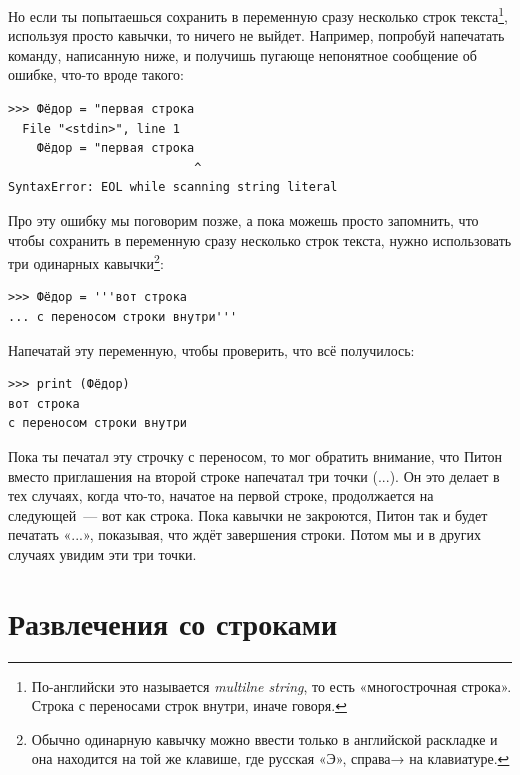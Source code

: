 Но если ты попытаешься сохранить в переменную сразу несколько строк текста\footnote{По-английски это называется \emph{multilne string}, то есть «многострочная строка». Строка с переносами строк внутри, иначе говоря.}, используя просто кавычки, то ничего не выйдет. Например, попробуй напечатать команду, написанную ниже, и получишь пугающе непонятное сообщение об ошибке, что-то вроде такого:

\begin{listing}
\begin{verbatim}
>>> Фёдор = "первая строка
  File "<stdin>", line 1
    Фёдор = "первая строка
                          ^
SyntaxError: EOL while scanning string literal
\end{verbatim}
\end{listing}

Про эту ошибку мы поговорим позже, а пока можешь просто запомнить, что чтобы сохранить в переменную сразу несколько строк текста, нужно использовать три одинарных кавычки\footnote{Обычно одинарную кавычку можно ввести только в английской раскладке и она находится на той же клавише, где русская «Э», справа→ на клавиатуре.}:

\begin{listing}
\begin{verbatim}
>>> Фёдор = '''вот строка
... с переносом строки внутри'''
\end{verbatim}
\end{listing}

Напечатай эту переменную, чтобы проверить, что всё получилось:

\begin{listing}
\begin{verbatim}
>>> print (Фёдор)
вот строка
с переносом строки внутри
\end{verbatim}
\end{listing}

Пока ты печатал эту строчку с переносом, то мог обратить внимание, что Питон вместо приглашения на второй строке напечатал три точки (...). Он это делает в тех случаях, когда что-то, начатое на первой строке, продолжается на следующей — вот как строка. Пока кавычки не закроются, Питон так и будет печатать «...», показывая, что ждёт завершения строки. Потом мы и в других случаях увидим эти три точки.

\section{Развлечения со строками}

